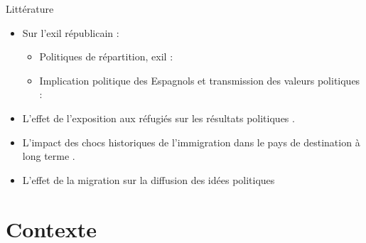 \documentclass[xcolor=dvipsnames, aspectratio=169]{beamer}
\begin{document}
\begin{frame}{Littérature}
\begin{itemize}
    \pause
    \item Sur l'exil républicain :
    \begin{itemize}
    \vspace{0.1in}
    \item Politiques de répartition, exil : \textcolor{gray}{\citep{DreyfusArmand1999, rafaneau20081939, perez_rodriguez_indeseables_2022}}
    \vspace{0.1in}
    \item Implication politique des Espagnols et transmission des valeurs politiques : \textcolor{gray}{\citep{dreyfus-armand_refugies_2016, Coignard2012}}
    \end{itemize}
    \pause
    \vspace{0.1in}
        \item L'effet de l'exposition aux réfugiés sur les résultats politiques \textcolor{gray}{\citep{halla_immigration_2017, dustmann_refugee_2018, hangartner_refugee_2019, edo_immigration_2019, steinmayr_contact_2021, alesina_political_2024}}.             \vspace{0.1in}
        \item L'impact des chocs historiques de l'immigration dans le pays de destination à long terme \textcolor{gray}{\citep{tabellini_gifts_2020, schindler_shocking_2021, bursztyn_immigrant_2024, chevalier_forced_2024, ochsner_activated_2024, toews_enemies_2025}}.
            \vspace{0.1in}
        \item L'effet de la migration sur la diffusion des idées politiques \textcolor{gray}{\citep{spilimbergo_democracy_2009, barsbai_effect_2017, dippel_leadership_2021, calderon_racial_2023, bazzi_confederate_2023}}        
\end{itemize}

\end{frame}

\section{Contexte}
\end{document}
